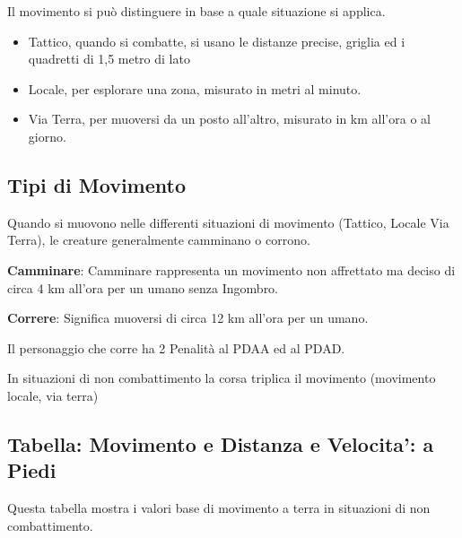 \documentclass[12pt,a4paper,twoside,openany]{book}
\begin{document}
\begin{multicols}{2}

Il movimento si può distinguere in base a quale situazione si applica.

\medskip

\begin{itemize}
\item Tattico, quando si combatte, si usano le distanze precise, griglia ed i quadretti di 1,5 metro di lato
\item Locale, per esplorare una zona, misurato in metri al minuto.
\item Via Terra, per muoversi da un posto all'altro, misurato in km all'ora o al giorno.
\end{itemize}

\subsection{Tipi di Movimento}\label{tipodimovimento}

Quando si muovono nelle differenti situazioni di movimento (Tattico, Locale Via Terra), le creature generalmente camminano o corrono.

\textbf{Camminare}: Camminare rappresenta un movimento non affrettato ma deciso di circa 4 km all'ora per un umano senza Ingombro.

\textbf{Correre}: Significa muoversi di circa 12 km all'ora per un umano.

Il personaggio che corre ha 2 Penalità al PDAA ed al PDAD.

In situazioni di non combattimento la corsa triplica il movimento (movimento locale, via terra)

\subsection{Tabella: Movimento e Distanza e Velocita': a Piedi}

Questa tabella mostra i valori base di movimento a terra in situazioni di non combattimento.

\bigskip


\end{multicols}
\end{document}
